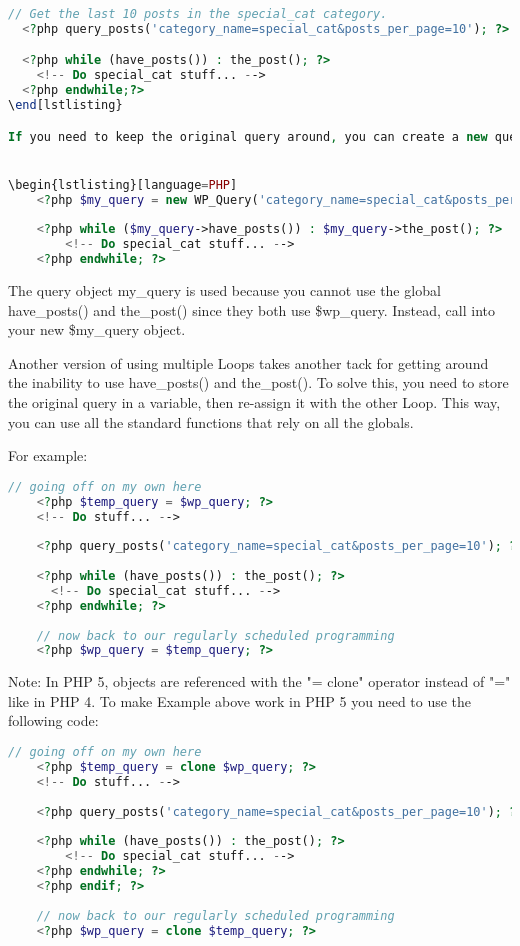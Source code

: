 \begin{lstlisting}[language=PHP]
  // Get the last 10 posts in the special_cat category.
  <?php query_posts('category_name=special_cat&posts_per_page=10'); ?>

  <?php while (have_posts()) : the_post(); ?>
    <!-- Do special_cat stuff... -->
  <?php endwhile;?>
\end[lstlisting}

If you need to keep the original query around, you can create a new query object.


\begin{lstlisting}[language=PHP]
	<?php $my_query = new WP_Query('category_name=special_cat&posts_per_page=10'); ?>
	
	<?php while ($my_query->have_posts()) : $my_query->the_post(); ?>
		<!-- Do special_cat stuff... -->
	<?php endwhile; ?>
\end{lstlisting}

The query object my\_query is used because you cannot use the global have\_posts() and the\_post() since they both use \$wp\_query. Instead, call into your new \$my\_query object.

Another version of using multiple Loops takes another tack for getting around the inability to use have\_posts() and the\_post(). To solve this, you need to store the original query in a variable, then re-assign it with the other Loop. This way, you can use all the standard functions that rely on all the globals.

For example:

\begin{lstlisting}[language=PHP]
	// going off on my own here
	<?php $temp_query = $wp_query; ?>
	<!-- Do stuff... -->
	
	<?php query_posts('category_name=special_cat&posts_per_page=10'); ?>
	
	<?php while (have_posts()) : the_post(); ?>
	  <!-- Do special_cat stuff... -->
	<?php endwhile; ?>
	
	// now back to our regularly scheduled programming
	<?php $wp_query = $temp_query; ?>
\end{lstlisting}

Note: In PHP 5, objects are referenced with the "= clone" operator instead of "=" like in PHP 4. To make Example above work in PHP 5 you need to use the following code:

\begin{lstlisting}[language=PHP]
	// going off on my own here
	<?php $temp_query = clone $wp_query; ?>
	<!-- Do stuff... -->
	 
	<?php query_posts('category_name=special_cat&posts_per_page=10'); ?>
	 
	<?php while (have_posts()) : the_post(); ?>
		<!-- Do special_cat stuff... -->
	<?php endwhile; ?>
	<?php endif; ?>
	 
	// now back to our regularly scheduled programming
	<?php $wp_query = clone $temp_query; ?>
\end{lstlisting}

